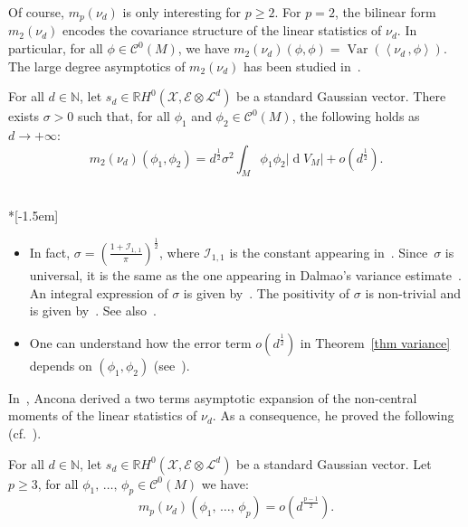 \documentclass[AHL,Unicode,longabstracts,published]{cedram}
\DeclareMathOperator{\dmesure}{d}
\DeclareMathOperator{\Var}{Var}
\newcommand{\E}{\mathcal{E}}
\newcommand{\I}{\mathcal{I}}
\newcommand{\X}{\mathcal{X}}
\renewcommand{\L}{\mathcal{L}}
\newcommand{\clC}{\mathcal{C}}
\newcommand{\N}{\mathbb{N}}
\newcommand{\R}{\mathbb{R}}
\newcommand{\norm}[1]{\left\lvert #1 \right\rvert}
\newcommand{\prsc}[2]{\left\langle #1\,, #2 \right\rangle}
\newcommand{\rmes}[1]{\norm{\dmesure\! V_{#1}}}
\newcommand{\var}[1]{\Var\!\left(#1 \right)}
\renewcommand{\H}{H^0(\X,\E \otimes \L^d)}
\renewcommand{\geq}{\geqslant}
\begin{document}
Of course, $m_p(\nu_d)$ is only interesting for $p \geq 2$. For $p=2$, the bilinear form $m_2(\nu_d)$ encodes the covariance structure of the linear statistics of $\nu_d$. In particular, for all $\phi \in \clC^0(M)$, we have $m_2(\nu_d)(\phi,\phi) = \var{\prsc{\nu_d}{\phi}}$. The large degree asymptotics of $m_2(\nu_d)$ has been studied in~\cite[Theorem~1.6]{LP2019}.

\begin{theo}\label{thm variance}
For all $d \in \N$, let $s_d \in \R\H$ be a standard Gaussian vector. There exists $\sigma >0$ such that, for all $\phi_1$ and $\phi_2 \in \clC^0(M)$, the following holds as $d \to +\infty$:
\[
m_2(\nu_d)(\phi_1,\phi_2) =d^\frac{1}{2} \sigma^2\int_M \phi_1 \phi_2 \rmes{M} + o\left(d^{\frac{1}{2}}\right).
\]
\end{theo}

\begin{remas}\label{rems thm variance}\ \\*[-1.5em]
\begin{itemize}
\item In fact, $\sigma = (\tfrac{1+\I_{1,\,1}}{\pi})^\frac{1}{2}$, where $\I_{1,1}$ is the constant appearing in~\cite[Theorem~1.6]{LP2019}. Since~$\sigma$ is universal, it is the same as the one appearing in Dalmao's variance estimate~\cite[Theorem~1.1]{Dal2015}. An integral expression of $\sigma$ is given by~\cite[Proposition~3.1]{Dal2015}. The positivity of $\sigma$ is non-trivial and is given by~\cite[Corollary~1.2]{Dal2015}. See also~\cite[Theorem~1.8]{LP2019}.
\item One can understand how the error term $o(d^{\frac{1}{2}})$ in Theorem~\ref{thm variance} depends on $(\phi_1,\phi_2)$ (see~\cite[Theorem~1.6]{LP2019}).
\end{itemize}
\end{remas}

In~\cite{Anc2019}, Ancona derived a two terms asymptotic expansion of the non-central moments of the linear statistics of $\nu_d$. As a consequence, he proved the following (cf.~\cite[Theorem~0.5]{Anc2019}).

\begin{theo}[{Ancona}]\label{thm non-central moments}
For all $d \in \N$, let $s_d \in \R\H$ be a standard Gaussian vector. Let $p \geq 3$, for all $\phi_1,\,\dots,\,\phi_p \in \clC^0(M)$ we have:
\[
m_p(\nu_d)(\phi_1,\,\dots,\,\phi_p)= o\left(d^\frac{p-1}{2}\right).
\]
\end{theo}
\end{document}
